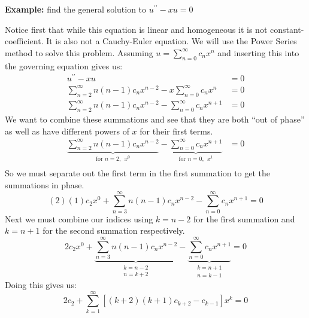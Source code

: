 \vspace{1.5cm}
\noindent\textbf{Example:} find the general solution to $u^{\prime \prime}-xu = 0$

Notice first that while this equation is linear and homogeneous it is not constant-coefficient.  It is also not a Cauchy-Euler equation.  We will use the Power Series method to solve this problem.  Assuming $u=\sum_{n=0}^{\infty}c_n x^n$ and inserting this into the governing equation gives us:
\begin{align*}
u^{\prime \prime}-xu &= 0 \\
\sum\limits_{n=2}^{\infty}n(n-1)c_n x^{n-2} - x\sum\limits_{n=0}^{\infty}c_nx^n &= 0 \\
\sum\limits_{n=2}^{\infty}n(n-1)c_n x^{n-2} - \sum\limits_{n=0}^{\infty}c_n x^{n+1} &=0
\end{align*}
We want to combine these summations and see that they are both ``out of phase'' as well as have different powers of $x$ for their first terms.
\begin{align*}
\underbrace{\sum\limits_{n=2}^{\infty}n(n-1)c_n x^{n-2}}_{\text{for }n=2, \ \ x^0} - \underbrace{\sum\limits_{n=0}^{\infty}c_n x^{n+1}}_{\text{for }n=0, \ \ x^1} &=0 \\
\end{align*}
So we must separate out the first term in the first summation to get the summations in phase.
\begin{equation*}
(2)(1)c_2x^0 + \sum\limits_{n=3}^{\infty}n(n-1)c_n x^{n-2} - \sum\limits_{n=0}^{\infty}c_n x^{n+1} = 0
\end{equation*}
Next we must combine our indices using $k=n-2$ for the first summation and $k=n+1$ for the second summation respectively.  
\begin{equation*}
2c_2x^0 + \underbrace{\sum\limits_{n=3}^{\infty}n(n-1)c_n x^{n-2}}_{\substack{k=n-2 \\n=k+2}} - \underbrace{\sum\limits_{n=0}^{\infty}c_n x^{n+1}}_{\substack{k=n+1 \\ n=k-1}} = 0
\end{equation*}
Doing this gives us:
\begin{equation*}
2c_2 + \sum\limits_{k=1}^{\infty} \left[(k+2)(k+1)c_{k+2} - c_{k-1}\right]x^k = 0
\end{equation*}
